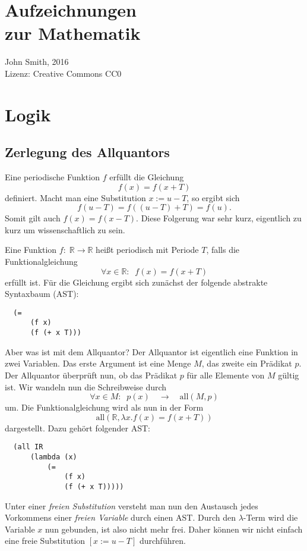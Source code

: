 \documentclass[a4paper,10pt,fleqn,twocolumn,twoside]{article}
\numberwithin{equation}{section}
\begin{document}
\section*{Aufzeichnungen\\
zur Mathematik}
John Smith, 2016\\
Lizenz: Creative Commons CC0

\tableofcontents

\section{Logik}
\subsection{Zerlegung des Allquantors}
Eine periodische Funktion $f$ erfüllt die Gleichung
\begin{equation}
f(x) = f(x+T)
\end{equation}
definiert. Macht man eine Substitution $x:=u-T$, so ergibt sich
\begin{equation}
f(u-T) = f((u-T)+T) = f(u).
\end{equation}
Somit gilt auch $f(x)=f(x-T)$. Diese Folgerung war sehr kurz,
eigentlich zu kurz um wissenschaftlich zu sein.

Eine Funktion $f{:}\;\mathbb R\rightarrow\mathbb R$
heißt periodisch mit Periode $T$, falls die
Funktionalgleichung
\begin{equation}
\forall x{\in}\mathbb R{:}\;\; f(x) = f(x+T)
\end{equation}
erfüllt ist. Für die Gleichung ergibt sich zunächst
der folgende abstrakte Syntaxbaum (AST):
\begin{verbatim}
  (=
      (f x)
      (f (+ x T)))
\end{verbatim}
Aber was ist mit dem Allquantor? Der Allquantor ist eigentlich
eine Funktion in zwei Variablen. Das erste Argument ist eine Menge $M$,
das zweite ein Prädikat $p$. Der Allquantor überprüft nun, ob das
Prädikat $p$ für alle Elemente von $M$ gültig ist. Wir wandeln nun
die Schreibweise durch
\begin{equation}
\forall x{\in}M{:}\;\; p(x)\quad\longrightarrow\quad
\mathrm{all}(M,p)
\end{equation}
um. Die Funktionalgleichung wird als nun in der Form
\begin{equation}\label{periodisch-all}
\mathrm{all}(\mathbb R,\lambda x. f(x) = f(x+T))
\end{equation}
dargestellt. Dazu gehört folgender AST:
\begin{verbatim}
  (all IR
      (lambda (x)
          (=
              (f x)
              (f (+ x T)))))
\end{verbatim}
Unter einer \textit{freien Substitution} versteht man nun den
Austausch jedes Vorkommens einer \textit{freien Variable}
durch einen AST. Durch den $\lambda$-Term wird die
Variable $x$ nun gebunden, ist also nicht mehr frei.
Daher können wir nicht einfach eine freie Substitution
$[x{:=}u{-}T]$ durchführen.
\end{document}
